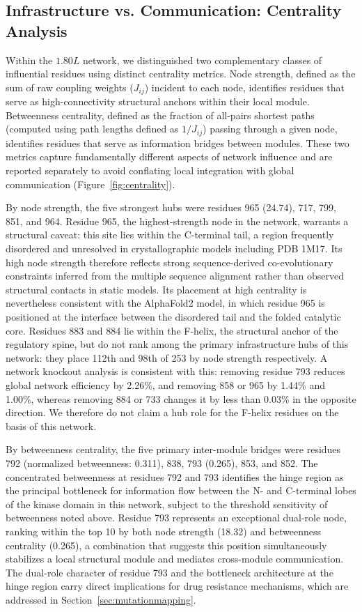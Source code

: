\documentclass[utf8]{FrontiersinHarvard}
\begin{document}
\subsection{Infrastructure vs. Communication: Centrality Analysis}

Within the $1.80L$ network, we distinguished two complementary classes of influential residues using distinct centrality metrics. Node strength, defined as the sum of raw coupling weights ($J_{ij}$) incident to each node, identifies residues that serve as high-connectivity structural anchors within their local module. Betweenness centrality, defined as the fraction of all-pairs shortest paths (computed using path lengths defined as $1/J_{ij}$) passing through a given node, identifies residues that serve as information bridges between modules. These two metrics capture fundamentally different aspects of network influence and are reported separately to avoid conflating local integration with global communication (Figure~\ref{fig:centrality}).

By node strength, the five strongest hubs were residues 965 (24.74), 717, 799, 851, and 964. Residue 965, the highest-strength node in the network, warrants a structural caveat: this site lies within the C-terminal tail, a region frequently disordered and unresolved in crystallographic models including PDB 1M17. Its high node strength therefore reflects strong sequence-derived co-evolutionary constraints inferred from the multiple sequence alignment rather than observed structural contacts in static models. Its placement at high centrality is nevertheless consistent with the AlphaFold2 model, in which residue 965 is positioned at the interface between the disordered tail and the folded catalytic core. Residues 883 and 884 lie within the \textalpha{}F-helix, the structural anchor of the regulatory spine, but do not rank among the primary infrastructure hubs of this network: they place 112th and 98th of 253 by node strength respectively. A network knockout analysis is consistent with this: removing residue 793 reduces global network efficiency by 2.26\%, and removing 858 or 965 by 1.44\% and 1.00\%, whereas removing 884 or 733 changes it by less than 0.03\% in the opposite direction. We therefore do not claim a hub role for the \textalpha{}F-helix residues on the basis of this network.

By betweenness centrality, the five primary inter-module bridges were residues 792 (normalized betweenness: 0.311), 838, 793 (0.265), 853, and 852. The concentrated betweenness at residues 792 and 793 identifies the hinge region as the principal bottleneck for information flow between the N- and C-terminal lobes of the kinase domain in this network, subject to the threshold sensitivity of betweenness noted above. Residue 793 represents an exceptional dual-role node, ranking within the top 10 by both node strength (18.32) and betweenness centrality (0.265), a combination that suggests this position simultaneously stabilizes a local structural module and mediates cross-module communication. The dual-role character of residue 793 and the bottleneck architecture at the hinge region carry direct implications for drug resistance mechanisms, which are addressed in Section~\ref{sec:mutationmapping}.
\end{document}
